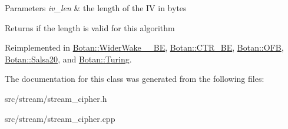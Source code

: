 \begin{DoxyParams}{Parameters}
{\em iv\-\_\-len} & the length of the I\-V in bytes \\
\hline
\end{DoxyParams}
\begin{DoxyReturn}{Returns}
if the length is valid for this algorithm 
\end{DoxyReturn}


Reimplemented in \hyperlink{classBotan_1_1WiderWake__41__BE_ac88514fcc75e8ebf25841eb5a89c8aed}{Botan\-::\-Wider\-Wake\-\_\-\_\-\-B\-E}, \hyperlink{classBotan_1_1CTR__BE_aff10f4ae2f0d4054c78ab3d9dce7be31}{Botan\-::\-C\-T\-R\-\_\-\-B\-E}, \hyperlink{classBotan_1_1OFB_a9fa202cf66788f827a7a745ad8d4b07e}{Botan\-::\-O\-F\-B}, \hyperlink{classBotan_1_1Salsa20_a2a33127742dc2ace54e9d7e7d7c68b23}{Botan\-::\-Salsa20}, and \hyperlink{classBotan_1_1Turing_a34da82793efbceb49c5f50d3f6d917ed}{Botan\-::\-Turing}.



The documentation for this class was generated from the following files\-:\begin{DoxyCompactItemize}
\item 
src/stream/stream\-\_\-cipher.\-h\item 
src/stream/stream\-\_\-cipher.\-cpp\end{DoxyCompactItemize}
